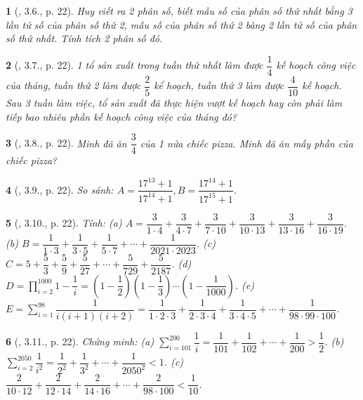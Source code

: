 \documentclass{article}
\newtheorem{baitoan}{}
\begin{document}
\begin{baitoan}[\cite{Binh_boi_duong_Toan_6_tap_2}, 3.6., p. 22]
	Huy viết ra 2 phân số, biết mẫu số của phân số thứ nhất bằng 3 lần tử số của phân số thứ 2, mẫu số của phân số thứ 2 bàng 2 lần tử số của phân số thứ nhất. Tính tích 2 phân số đó.
\end{baitoan}

\begin{baitoan}[\cite{Binh_boi_duong_Toan_6_tap_2}, 3.7., p. 22]
	1 tổ sản xuất trong tuần thứ nhất làm được $\dfrac{1}{4}$ kế hoạch công việc của tháng, tuần thứ 2 làm được $\dfrac{2}{5}$ kể hoạch, tuần thứ 3 làm được $\dfrac{4}{10}$ kế hoạch. Sau 3 tuần làm việc, tổ sản xuất đã thực hiện vượt kế hoạch hay còn phải làm tiếp bao nhiêu phần kế hoạch công việc của tháng đó?
\end{baitoan}

\begin{baitoan}[\cite{Binh_boi_duong_Toan_6_tap_2}, 3.8., p. 22]
	Minh đã ăn $\dfrac{3}{4}$ của 1 nửa chiếc pizza. Minh đã ăn mấy phần của chiếc pizza?
\end{baitoan}

\begin{baitoan}[\cite{Binh_boi_duong_Toan_6_tap_2}, 3.9., p. 22]
	So sánh: $A = \dfrac{17^{13} + 1}{17^{14} + 1},B = \dfrac{17^{14} + 1}{17^{15} + 1}$.
\end{baitoan}

\begin{baitoan}[\cite{Binh_boi_duong_Toan_6_tap_2}, 3.10., p. 22]
	Tính: (a) $A = \dfrac{3}{1\cdot4} + \dfrac{3}{4\cdot7} + \dfrac{3}{7\cdot10} + \dfrac{3}{10\cdot13} + \dfrac{3}{13\cdot16} + \dfrac{3}{16\cdot19}$. (b) $B = \dfrac{1}{1\cdot3} + \dfrac{1}{3\cdot5} + \dfrac{1}{5\cdot7} + \cdots + \dfrac{1}{2021\cdot2023}$. (c) $C = 5 + \dfrac{5}{3} + \dfrac{5}{9} + \dfrac{5}{27} + \cdots + \dfrac{5}{729} + \dfrac{5}{2187}$. (d) $D = \prod_{i=2}^{1000} 1 - \dfrac{1}{i} = \left(1 - \dfrac{1}{2}\right)\left(1 - \dfrac{1}{3}\right)\cdots\left(1 - \dfrac{1}{1000}\right)$. (e) $E = \sum_{i=1}^{98} \dfrac{1}{i(i + 1)(i + 2)} = \dfrac{1}{1\cdot2\cdot3} + \dfrac{1}{2\cdot3\cdot4} + \dfrac{1}{3\cdot4\cdot5} + \cdots + \dfrac{1}{98\cdot99\cdot100}$.
\end{baitoan}

\begin{baitoan}[\cite{Binh_boi_duong_Toan_6_tap_2}, 3.11., p. 22]
	Chứng minh: (a) $\sum_{i=101}^{200} \dfrac{1}{i} = \dfrac{1}{101} + \dfrac{1}{102} + \cdots + \dfrac{1}{200} > \dfrac{1}{2}$. (b) $\sum_{i=2}^{2050} \dfrac{1}{i^2} = \dfrac{1}{2^2} + \dfrac{1}{3^2} + \cdots + \dfrac{1}{2050^2} < 1$. (c) $\dfrac{2}{10\cdot12} + \dfrac{2}{12\cdot14} + \dfrac{2}{14\cdot16} + \cdots + \dfrac{2}{98\cdot100} < \dfrac{1}{10}$.
\end{baitoan}
\end{document}
